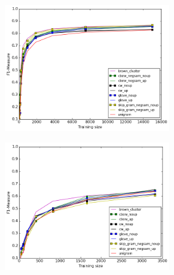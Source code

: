 \begin{figure}[h]
\caption{Best results for each method for NER and MWE}
\centering
\begin{subfigure}{.5\textwidth}
	\centering
    	\includegraphics[width=0.8\textwidth]{plots/bestNER.png}
	\label{fig:bestner}
\end{subfigure}
\begin{subfigure}{.5\textwidth}
	\centering
    	\includegraphics[width=0.8\textwidth]{plots/bestMWE.png}
	\label{fig:bestmwe}
\end{subfigure}  	
\end{figure}  	


